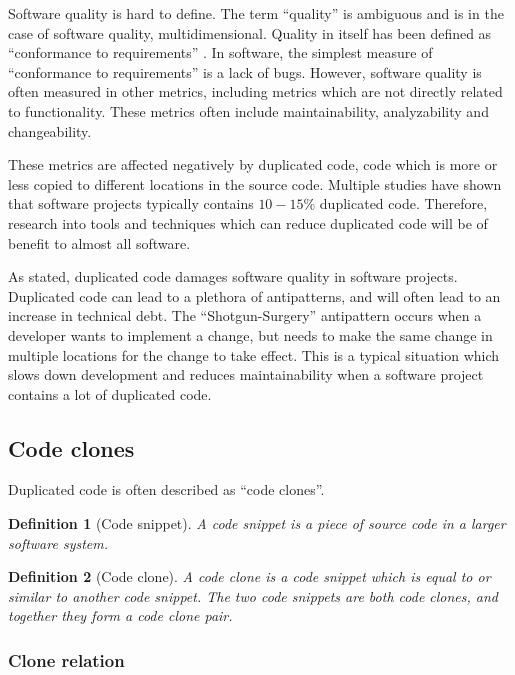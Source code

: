 \documentclass[12pt]{article}
\newtheorem{definition}{Definition}
\begin{document}
Software quality is hard to define. The term ``quality'' is ambiguous and is in the case
of software quality, multidimensional. Quality in itself has been defined as ``conformance
to requirements'' \cite[8]{crosby1980quality}. In software, the simplest measure of
``conformance to requirements'' is a lack of bugs. However, software
quality is often measured in other metrics, including metrics which are not directly
related to functionality\cite[29]{MetricsAndModelsInSoftwareQuality}. These metrics
often include maintainability, analyzability and changeability.

These metrics are affected negatively by duplicated code, code which is more or less
copied to different locations in the source code. Multiple studies have shown that
software projects typically contains $10-15\%$ duplicated code\cite{CloningByAccident}.
Therefore, research into tools and techniques which can reduce duplicated code will be of
benefit to almost all software.

As stated, duplicated code damages software quality in software projects. Duplicated code
can lead to a plethora of antipatterns, and will often lead to an increase in technical
debt. The ``Shotgun-Surgery''\cite[66]{fowlerrefactoring} antipattern occurs when a
developer wants to implement a change, but needs to make the same change in multiple
locations for the change to take effect. This is a typical situation which slows down
development and reduces maintainability when a software project contains a lot of
duplicated code.

\subsection{Code clones}

Duplicated code is often described as ``code clones''.

\begin{definition}[Code snippet]
	A code snippet is a piece of source code in a larger software system.
\end{definition}

\begin{definition}[Code clone]
	A code clone is a code snippet which is equal to or similar to another code snippet. The two
	code snippets are both code clones, and together they form a code clone pair.
\end{definition}

\subsubsection{Clone relation}
\end{document}
